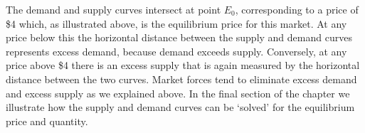 \newhtmlpage



The demand and supply curves intersect at point $E_0$, corresponding to a
price of \$4 which, as illustrated above, is the equilibrium price for this
market. At any price below this the horizontal distance between the supply
and demand curves represents excess demand, because demand exceeds supply.
Conversely, at any price above \$4 there is an excess supply that is again
measured by the horizontal distance between the two curves. Market forces
tend to eliminate excess demand and excess supply as we explained above. In
the final section of the chapter we illustrate how the supply and demand
curves can be `solved' for the equilibrium price and quantity.